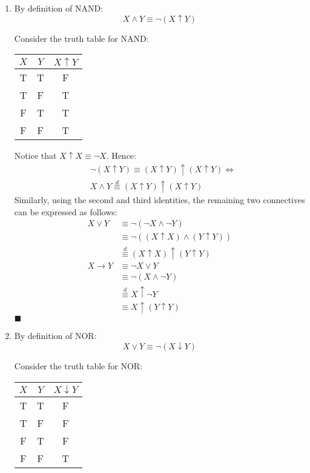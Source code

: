 \documentclass[12pt]{article}
\newcommand{\p}[1]{\item[\textnormal{(#1)}]}
\newcommand{\q}{\hfill $\blacksquare$}
\newenvironment{ps}
{\begin{enumerate}[leftmargin=0em, itemindent=1.5em]}
{\end{enumerate}}
\begin{document}
\begin{ps}
    \p{c} By definition of NAND: 
        \[
            X \wedge Y \equiv \neg (X \uparrow Y)
        \]   

        Consider the truth table for NAND:

        \begin{center}
        \begin{tabular}{|c|c|c|}
        \hline
        $X$ & $Y$ & $X \uparrow Y$ \\
        \hline
        T & T & F \\
        T & F & T \\
        F & T & T \\
        F & F & T \\
        \hline
        \end{tabular}
        \end{center}

        Notice that \( X \uparrow X \equiv \neg X \). Hence: 
        \begin{align*}
            &\neg (X \uparrow Y) \equiv (X \uparrow Y) \uparrow (X \uparrow Y) \Leftrightarrow \\
            &X \wedge Y \overset{d}{\equiv} (X \uparrow Y) \uparrow (X \uparrow Y)
        \end{align*}
        Similarly, using the second and third identities, the remaining two connectives can be
        expressed as follows: 
        \begin{align*}
            X \vee Y &\equiv \neg (\neg X \wedge \neg Y) \\
                     &\equiv \neg ((X \uparrow X) \wedge (Y \uparrow Y)) \\
                     &\overset{d}{\equiv} (X \uparrow X) \uparrow (Y \uparrow Y) \\
            X \rightarrow Y &\equiv \neg X \vee Y \\
                            &\equiv \neg (X \wedge \neg Y) \\
                            &\overset{d}{\equiv} X \uparrow \neg Y \\
                            &\equiv X \uparrow (Y \uparrow Y)
        \end{align*} \q

    \p{d} By definition of NOR: 
        \[
            X \vee Y \equiv \neg (X \downarrow Y)
        \]   

        Consider the truth table for NOR:

        \begin{center}
        \begin{tabular}{|c|c|c|}
        \hline
        $X$ & $Y$ & $X \downarrow Y$ \\
        \hline
        T & T & F \\
        T & F & F \\
        F & T & F \\
        F & F & T \\
        \hline
        \end{tabular}
        \end{center}


\end{ps}
\end{document}
